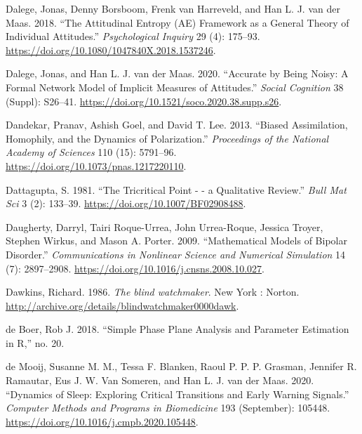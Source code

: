 \documentclass[
  a4paper,
  DIV=11,
  numbers=noendperiod,
  oneside]{scrreprt}
\newlength{\cslhangindent}
\newlength{\cslentryspacingunit} %
\newenvironment{CSLReferences}[2] %
 {%
  \setlength{\parindent}{0pt}
  \ifodd #1
  \let\oldpar\par
  \def\par{\hangindent=\cslhangindent\oldpar}
  \fi
  \setlength{\parskip}{#2\cslentryspacingunit}
 }%
 {}
\begin{document}
\begin{CSLReferences}{1}{0}
\leavevmode{}%
Dalege, Jonas, Denny Borsboom, Frenk van Harreveld, and Han L. J. van
der Maas. 2018. {``The {Attitudinal Entropy} ({AE}) Framework as a
General Theory of Individual Attitudes.''} \emph{Psychological Inquiry}
29 (4): 175--93. \url{https://doi.org/10.1080/1047840X.2018.1537246}.

\leavevmode{}%
Dalege, Jonas, and Han L. J. van der Maas. 2020. {``Accurate by Being
Noisy: {A} Formal Network Model of Implicit Measures of Attitudes.''}
\emph{Social Cognition} 38 (Suppl): S26--41.
\url{https://doi.org/10.1521/soco.2020.38.supp.s26}.

\leavevmode{}%
Dandekar, Pranav, Ashish Goel, and David T. Lee. 2013. {``Biased
Assimilation, Homophily, and the Dynamics of Polarization.''}
\emph{Proceedings of the National Academy of Sciences} 110 (15):
5791--96. \url{https://doi.org/10.1073/pnas.1217220110}.

\leavevmode{}%
Dattagupta, S. 1981. {``The Tricritical Point - - a Qualitative
Review.''} \emph{Bull Mat Sci} 3 (2): 133--39.
\url{https://doi.org/10.1007/BF02908488}.

\leavevmode{}%
Daugherty, Darryl, Tairi Roque-Urrea, John Urrea-Roque, Jessica Troyer,
Stephen Wirkus, and Mason A. Porter. 2009. {``Mathematical Models of
Bipolar Disorder.''} \emph{Communications in Nonlinear Science and
Numerical Simulation} 14 (7): 2897--2908.
\url{https://doi.org/10.1016/j.cnsns.2008.10.027}.

\leavevmode{}%
Dawkins, Richard. 1986. \emph{The blind watchmaker}. New York : Norton.
\url{http://archive.org/details/blindwatchmaker0000dawk}.

\leavevmode{}%
de Boer, Rob J. 2018. {``Simple Phase Plane Analysis and Parameter
Estimation in {R},''} no. 20.

\leavevmode{}%
de Mooij, Susanne M. M., Tessa F. Blanken, Raoul P. P. P. Grasman,
Jennifer R. Ramautar, Eus J. W. Van Someren, and Han L. J. van der Maas.
2020. {``Dynamics of Sleep: {Exploring} Critical Transitions and Early
Warning Signals.''} \emph{Computer Methods and Programs in Biomedicine}
193 (September): 105448.
\url{https://doi.org/10.1016/j.cmpb.2020.105448}.


\end{CSLReferences}
\end{document}
